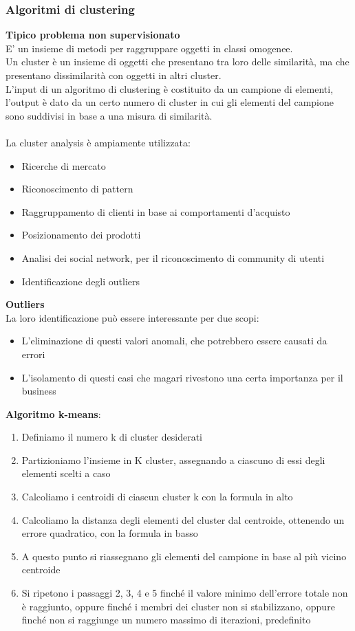 \documentclass[../main.tex]{subfiles}
\begin{document}
	\subsubsection{Algoritmi di clustering}
	\textbf{Tipico problema non supervisionato} \\
	E' un insieme di metodi per raggruppare oggetti in classi omogenee. \\
	Un cluster è un insieme di oggetti che presentano tra loro delle similarità, ma che presentano dissimilarità con oggetti in altri cluster. \\
	L'input di un algoritmo di clustering è costituito da un campione di elementi, l'output è dato da un certo numero di cluster in cui gli elementi del campione sono suddivisi in base a una misura di similarità.\\\\
	La cluster analysis è ampiamente utilizzata:
	\begin{itemize}
		\item Ricerche di mercato
		\item Riconoscimento di pattern
		\item Raggruppamento di clienti in base ai comportamenti d’acquisto
		\item Posizionamento dei prodotti
		\item Analisi dei social network, per il riconoscimento di community di utenti
		\item Identificazione degli outliers
	\end{itemize}
	\textbf{Outliers} \\
	La loro identificazione può essere interessante per due scopi:
	\begin{itemize}
		\item L’eliminazione di questi valori anomali, che potrebbero essere causati da errori
		\item L’isolamento di questi casi che magari rivestono una certa importanza per il business
	\end{itemize}
	\textbf{Algoritmo k-means}:
	\begin{enumerate}
		\item Definiamo il numero k di cluster desiderati
		\item Partizioniamo l’insieme in K cluster, assegnando a ciascuno di essi degli elementi scelti a caso
		\item Calcoliamo i centroidi di ciascun cluster k con la formula in alto
		\item Calcoliamo la distanza degli elementi del cluster dal centroide, ottenendo un errore quadratico, con la formula in basso
		\item A questo punto si riassegnano gli elementi del campione in base al più vicino centroide
		\item Si ripetono i passaggi 2, 3, 4 e 5 finché il valore minimo dell’errore totale non è raggiunto, oppure finché i membri dei cluster non si stabilizzano, oppure finché non si raggiunge un numero massimo di iterazioni, predefinito
	\end{enumerate}
\end{document}
